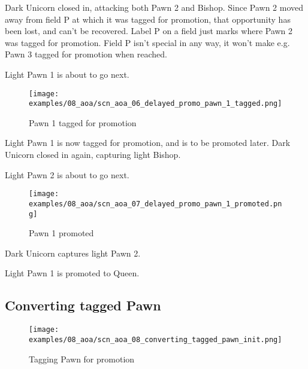 Dark Unicorn closed in, attacking both Pawn 2 and Bishop. Since Pawn 2 moved
away from field P at which it was tagged for promotion, that opportunity has
been lost, and can't be recovered. Label P on a field just marks where Pawn 2
was tagged for promotion. Field P isn't special in any way, it won't make e.g.
Pawn 3 tagged for promotion when reached.

Light Pawn 1 is about to go next.

\clearpage %

\noindent
\begin{figure}[h]
\texttt{[image: examples/08\_aoa/scn\_aoa\_06\_delayed\_promo\_pawn\_1\_tagged.png]}
\caption{Pawn 1 tagged for promotion}
\label{fig:scn_aoa_06_delayed_promo_pawn_1_tagged}
\end{figure}

Light Pawn 1 is now tagged for promotion, and is to be promoted later.
Dark Unicorn closed in again, capturing light Bishop.

Light Pawn 2 is about to go next.

\clearpage %

\noindent
\begin{figure}[h]
\texttt{[image: examples/08\_aoa/scn\_aoa\_07\_delayed\_promo\_pawn\_1\_promoted.png]}
\caption{Pawn 1 promoted}
\label{fig:scn_aoa_07_delayed_promo_pawn_1_promoted}
\end{figure}

Dark Unicorn captures light Pawn 2.

Light Pawn 1 is promoted to Queen.

\clearpage %

\subsection*{Converting tagged Pawn}
\label{sec:Age of Aquarius/Promotion/Converting tagged Pawn}

\noindent
\begin{figure}[h]
\texttt{[image: examples/08\_aoa/scn\_aoa\_08\_converting\_tagged\_pawn\_init.png]}
\caption{Tagging Pawn for promotion}
\label{fig:scn_aoa_08_converting_tagged_pawn_init}
\end{figure}

